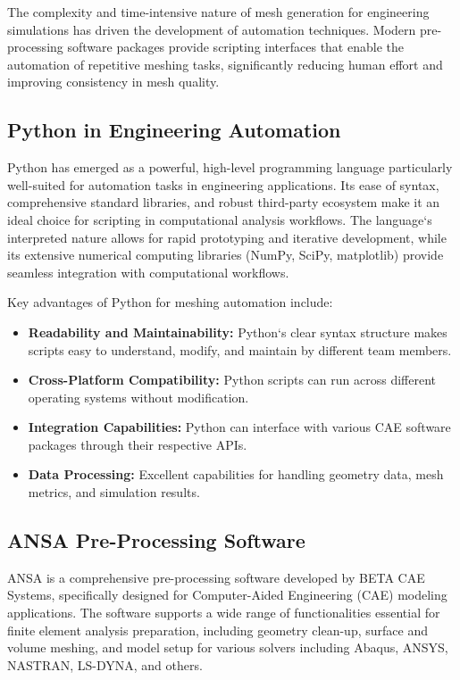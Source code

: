 \documentclass{book}
\begin{document}
\begin{itemize}[leftmargin=*,label=\textbullet]
The complexity and time-intensive nature of mesh generation for engineering simulations has driven the development of automation techniques. Modern pre-processing software packages provide scripting interfaces that enable the automation of repetitive meshing tasks, significantly reducing human effort and improving consistency in mesh quality.

\subsection{Python in Engineering Automation}

Python has emerged as a powerful, high-level programming language particularly well-suited for automation tasks in engineering applications. Its ease of syntax, comprehensive standard libraries, and robust third-party ecosystem make it an ideal choice for scripting in computational analysis workflows. The language`s interpreted nature allows for rapid prototyping and iterative development, while its extensive numerical computing libraries (NumPy, SciPy, matplotlib) provide seamless integration with computational workflows.

Key advantages of Python for meshing automation include:
\begin{itemize}[leftmargin=*,label=\textbullet]
    \item \textbf{Readability and Maintainability:} Python`s clear syntax structure makes scripts easy to understand, modify, and maintain by different team members.
    \item \textbf{Cross-Platform Compatibility:} Python scripts can run across different operating systems without modification.
    \item \textbf{Integration Capabilities:} Python can interface with various CAE software packages through their respective APIs.
    \item \textbf{Data Processing:} Excellent capabilities for handling geometry data, mesh metrics, and simulation results.
\end{itemize}

\subsection{ANSA Pre-Processing Software}

ANSA is a comprehensive pre-processing software developed by BETA CAE Systems, specifically designed for Computer-Aided Engineering (CAE) modeling applications. The software supports a wide range of functionalities essential for finite element analysis preparation, including geometry clean-up, surface and volume meshing, and model setup for various solvers including Abaqus, ANSYS, NASTRAN, LS-DYNA, and others.


\end{itemize}
\end{document}
